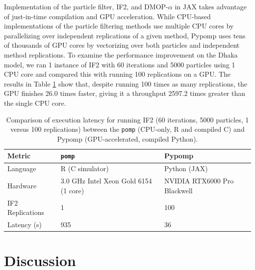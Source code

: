 \documentclass[11pt]{article}
\begin{document}
Implementation of the particle filter, IF2, and DMOP-$\alpha$ in JAX \citep{jax} takes advantage of just-in-time compilation and GPU acceleration.
While CPU-based implementations of the particle filtering methods use multiple CPU cores by parallelizing over independent replications of a given method, Pypomp uses tens of thousands of GPU cores by vectorizing over both particles and independent method replications.
To examine the performance improvement on the Dhaka model, we ran 1 instance of IF2 with 60 iterations and 5000 particles using 1 CPU core and compared this with running 100 replications on a GPU.
The results in Table \ref{table:speedup} show that, despite running 100 times as many replications, the GPU finishes 26.0 times faster, giving it a throughput 2597.2 times greater than the single CPU core.

\begin{table}[htbp!]
\centering
\begin{tabular}{lll}
\toprule
Metric & \texttt{pomp} \citep{king16} & Pypomp \citep{abkemeier25} \\
\midrule
Language & R (C simulator) & Python (JAX) \\
Hardware& 3.0 GHz Intel Xeon Gold 6154 (1 core) & NVIDIA RTX6000 Pro Blackwell \\
IF2 Replications & 1 & 100 \\
Latency (s) & 935 & 36 \\
\bottomrule
\end{tabular}
\caption{Comparison of execution latency for running IF2 (60 iterations, 5000 particles, 1 versus 100 replications) between the \texttt{pomp} (CPU-only, R and compiled C) and Pypomp (GPU-accelerated, compiled Python).}
\label{table:speedup}
\end{table}




\section{Discussion}
\end{document}
